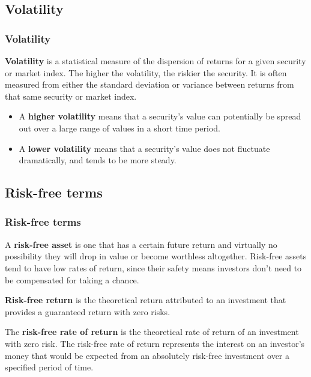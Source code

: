 \documentclass{beamer}
\begin{document}
\subsection{Volatility}

\begin{frame}
\frametitle{\textbf{Volatility}}

\begin{definition}
\justifying
\textbf{Volatility} is a statistical measure of the dispersion of returns for a given security or market index. The higher the volatility, the riskier the security. It is often measured from either the standard deviation or variance between returns from that same security or market index.
\end{definition}

\vspace{0.4cm}
\justifying
\begin{itemize}
	\justifying
	\item A \textbf{higher volatility} means that a security's value can potentially be spread out over a large range of values in a short time period.
	\item A \textbf{lower volatility} means that a security's value does not fluctuate dramatically, and tends to be more steady.
\end{itemize}

\end{frame}





\subsection{Risk-free terms}

\begin{frame}
\frametitle{\textbf{Risk-free terms}}

\begin{definition}
\justifying
A \textbf{risk-free asset} is one that has a certain future return and virtually no possibility they will drop in value or become worthless altogether. Risk-free assets tend to have low rates of return, since their safety means investors don't need to be compensated for taking a chance.
\end{definition}

\begin{definition}
\justifying
\textbf{Risk-free return} is the theoretical return attributed to an investment that provides a guaranteed return with zero risks.
\end{definition}

\begin{definition}
\justifying
The \textbf{risk-free rate of return} is the theoretical rate of return of an investment with zero risk.  The risk-free rate of return represents the interest on an investor's money that would be expected from an absolutely risk-free investment over a specified period of time.
\end{definition}

\end{frame}
\end{document}
